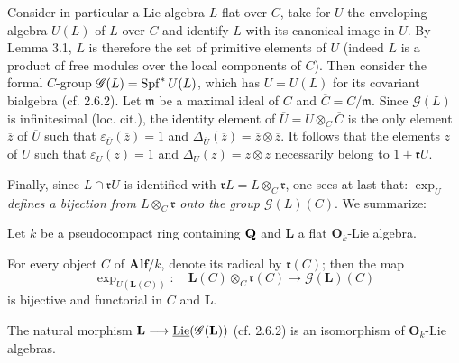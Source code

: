 Consider in particular a Lie algebra $L$ flat over $C$, take for $U$ the enveloping algebra $U(L)$ of $L$ over $C$ and identify $L$ with its canonical image in $U$. By Lemma 3.1, $L$ is therefore the set of primitive elements of $U$ (indeed $L$ is a product of free modules over the local components of $C$). Then consider the formal $C$-group $\mathscr G(L)=\operatorname{Spf}^*U(L)$, which has $U=U(L)$ for its covariant bialgebra (cf. 2.6.2). Let $\mathfrak m$ be a maximal ideal of $C$ and $\overline C=C/\mathfrak m$. Since $\mathscr G(L)$ is infinitesimal (loc. cit.), the identity element of $\overline U=U\otimes_C\overline C$ is the only element $\overline z$ of $\overline U$ such that $\varepsilon_{\overline U}(\overline z)=1$ and $\Delta_{\overline U}(\overline z)=\overline z\otimes\overline z$. It follows that the elements $z$ of $U$ such that $\varepsilon_U(z)=1$ and $\Delta_U(z)=z\otimes z$ necessarily belong to $1+\mathfrak rU$.

Finally, since $L\cap\mathfrak rU$ is identified with $\mathfrak rL=L\otimes_C\mathfrak r$, one sees at last that: \emph{$\exp_U$ defines a bijection from $L\otimes_C\mathfrak r$ onto the group $\mathscr G(L)(C)$}. We summarize:
\begin{proposition}{}
Let $k$ be a pseudocompact ring containing $\mathbf{Q}$ and $\mathbf L$ a flat $\mathbf O_k$-Lie algebra.
\begin{enumeratei}
\item For every object $C$ of $\mathbf{Alf}/k$, denote its radical by $\mathfrak r(C)$; then the map
\[
\exp_{U(\mathbf L(C))}:\quad\mathbf L(C)\otimes_C\mathfrak r(C)\longrightarrow\mathscr G(\mathbf L)(C)
\]
is bijective and functorial in $C$ and $\mathbf L$.
\item The natural morphism $\mathbf L\longrightarrow\underline{\operatorname{Lie}}(\mathscr G(\mathbf L))$ (cf. 2.6.2) is an isomorphism of $\mathbf O_k$-Lie algebras.
\end{enumeratei}
\end{proposition}

